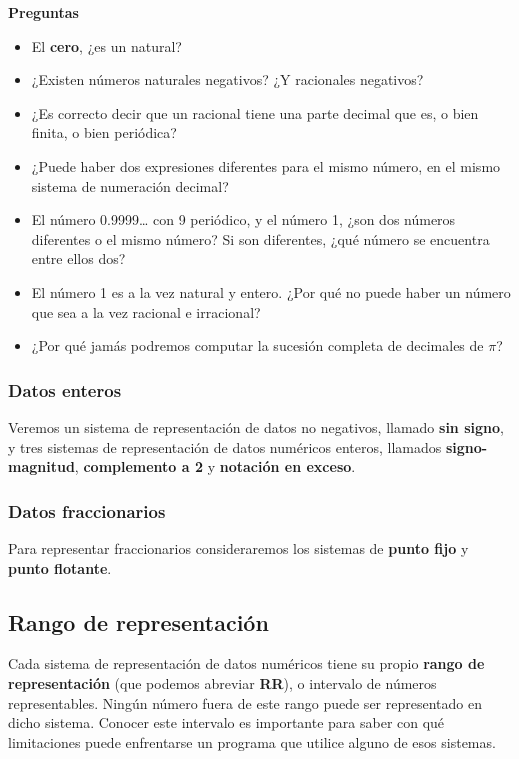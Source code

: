 \documentclass[spanish,a4paper,]{article}
\providecommand{\tightlist}{%
  \setlength{\itemsep}{0pt}\setlength{\parskip}{0pt}}
\begin{document}
\textbf{Preguntas}

\begin{itemize}
\tightlist
\item
  El \textbf{cero}, ¿es un natural?
\item
  ¿Existen números naturales negativos? ¿Y racionales negativos?
\item
  ¿Es correcto decir que un racional tiene una parte decimal que es, o
  bien finita, o bien periódica?
\item
  ¿Puede haber dos expresiones diferentes para el mismo número, en el
  mismo sistema de numeración decimal?
\item
  El número 0.9999\ldots{} con 9 periódico, y el número 1, ¿son dos
  números diferentes o el mismo número? Si son diferentes, ¿qué número
  se encuentra entre ellos dos?
\item
  El número 1 es a la vez natural y entero. ¿Por qué no puede haber un
  número que sea a la vez racional e irracional?
\item
  ¿Por qué jamás podremos computar la sucesión completa de decimales de
  \(\pi\)?
\end{itemize}

\hypertarget{datos-enteros}{%
\subsubsection{Datos enteros}\label{datos-enteros}}

Veremos un sistema de representación de datos no negativos, llamado
\textbf{sin signo}, y tres sistemas de representación de datos numéricos
enteros, llamados \textbf{signo-magnitud}, \textbf{complemento a 2} y
\textbf{notación en exceso}.

\hypertarget{datos-fraccionarios}{%
\subsubsection{Datos fraccionarios}\label{datos-fraccionarios}}

Para representar fraccionarios consideraremos los sistemas de
\textbf{punto fijo} y \textbf{punto flotante}.

\hypertarget{rango-de-representaciuxf3n}{%
\subsection{Rango de representación}\label{rango-de-representaciuxf3n}}

Cada sistema de representación de datos numéricos tiene su propio
\textbf{rango de representación} (que podemos abreviar \textbf{RR}), o
intervalo de números representables. Ningún número fuera de este rango
puede ser representado en dicho sistema. Conocer este intervalo es
importante para saber con qué limitaciones puede enfrentarse un programa
que utilice alguno de esos sistemas.
\end{document}
